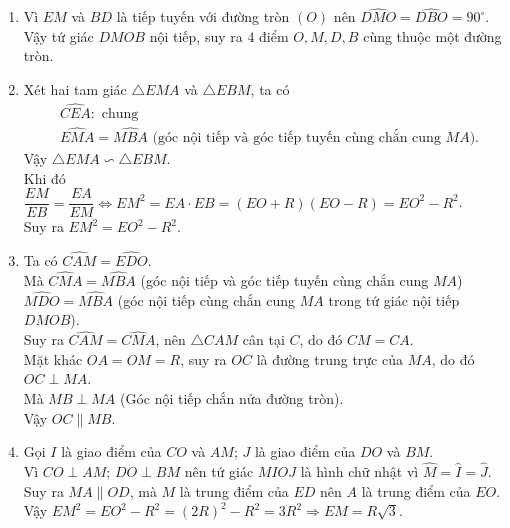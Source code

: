 \begin{bt}
{\begin{center}
\end{center}

	\begin{enumerate}
	\item Vì $EM$ và $BD$ là tiếp tuyến với đường tròn $(O)$ nên $\widehat{DMO}=\widehat{DBO}=90^\circ$.\\
	Vậy tứ giác $DMOB$ nội tiếp, suy ra $4$ điểm $O, M, D, B$ cùng thuộc một đường tròn.
	\item Xét hai tam giác $\triangle EMA$ và $\triangle EBM$, ta có 
	\begin{align*}
		&\widehat{CEA}: \text{ chung}\\
		&\widehat{EMA}=\widehat{MBA} \text{ (góc nội tiếp và góc tiếp tuyến cùng chắn cung $MA$).}
	\end{align*}
	Vậy $\triangle EMA\backsim \triangle EBM$.\\
	Khi đó $\dfrac{EM}{EB}=\dfrac{EA}{EM}\Leftrightarrow EM^2=EA\cdot EB=(EO+R)(EO-R)=EO^2-R^2$.\\
	Suy ra $EM^2=EO^2-R^2$.
	\item Ta có $\widehat{CAM}=\widehat{EDO}$.\\
	Mà $\widehat{CMA}=\widehat{MBA}$ (góc nội tiếp và góc tiếp tuyến cùng chắn cung $MA$)\\
	$\widehat{MDO}=\widehat{MBA}$ (góc nội tiếp cùng chắn cung $MA$ trong tứ giác nội tiếp $DMOB$).\\
	Suy ra $\widehat{CAM}=\widehat{CMA}$, nên $\triangle CAM$ cân tại $C$, do đó $CM=CA$.\\
	Mặt khác $OA=OM=R$, suy ra $OC$ là đường trung trực của $MA$, do đó $OC\perp MA$.\\
	Mà $MB\perp MA$ (Góc nội tiếp chắn nửa đường tròn).\\
	Vậy $OC \parallel MB$.
	\item Gọi $I$ là giao điểm của $CO$ và $AM$; $J$ là giao điểm của $DO$ và $BM$.\\
	Vì $CO\perp AM$; $DO\perp BM$ nên tứ giác $MIOJ$ là hình chữ nhật vì $\widehat{M}=\widehat{I}=\widehat{J}$.\\
	Suy ra $MA\parallel OD$, mà $M$ là trung điểm của $ED$ nên $A$ là trung điểm của $EO$.\\
	Vậy $EM^2=EO^2-R^2=(2R)^2-R^2=3R^2\Rightarrow EM=R\sqrt{3}$.
	\end{enumerate}
}
\end{bt}

